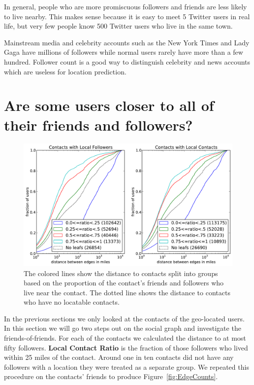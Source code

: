In general, people who are more promiscuous followers and friends are less
likely to live nearby. This makes sense because it is easy to meet 5 Twitter
users in real life, but very few people know 500 Twitter users who live in the
same town.

Mainstream media and celebrity accounts such as the New York Times and Lady
Gaga have millions of followers while normal users rarely have more than a few
hundred.
Follower count is a good way to distinguish celebrity and news accounts which
are useless for location prediction.

\section{Are some users closer to all of their friends and followers?}

\begin{figure}[tb]
\centering
\includegraphics[width=\linewidth]{figures/local_ratio.pdf}
\caption{
The colored lines show the distance to contacts split into groups based on the
proportion of the contact's friends and followers who live near the contact.
The dotted line shows the distance to contacts who have no locatable contacts.
}
\label{fig:LocalRatio}
\end{figure}

In the previous sections we only looked at the contacts of the geo-located
users. In this section we will go two steps out on the social graph and
investigate the friends-of-friends.
%
For each of the contacts we calculated the distance to at most fifty followers.
%
\textbf{Local Contact Ratio} is the fraction of those followers who lived within 25 miles
of the contact.
%
Around one in ten contacts did not have any followers with a location they were
treated as a separate group.
%
We repeated this procedure on the contacts' friends to produce
Figure~\ref{fig:EdgeCounts}.

